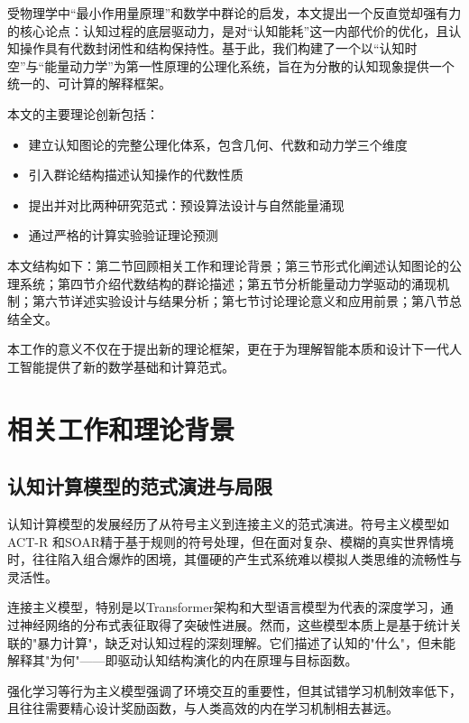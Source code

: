 \documentclass[12pt,a4paper]{article}
\begin{document}
受物理学中“最小作用量原理”和数学中群论的启发，本文提出一个反直觉却强有力的核心论点：认知过程的底层驱动力，是对“认知能耗”这一内部代价的优化，且认知操作具有代数封闭性和结构保持性。基于此，我们构建了一个以“认知时空”与“能量动力学”为第一性原理的公理化系统，旨在为分散的认知现象提供一个统一的、可计算的解释框架。

本文的主要理论创新包括：
\begin{itemize}
    \item 建立认知图论的完整公理化体系，包含几何、代数和动力学三个维度
    \item 引入群论结构描述认知操作的代数性质
    \item 提出并对比两种研究范式：预设算法设计与自然能量涌现
    \item 通过严格的计算实验验证理论预测
\end{itemize}

本文结构如下：第二节回顾相关工作和理论背景；第三节形式化阐述认知图论的公理系统；第四节介绍代数结构的群论描述；第五节分析能量动力学驱动的涌现机制；第六节详述实验设计与结果分析；第七节讨论理论意义和应用前景；第八节总结全文。

本工作的意义不仅在于提出新的理论框架，更在于为理解智能本质和设计下一代人工智能提供了新的数学基础和计算范式。

\section{相关工作和理论背景}

\subsection{认知计算模型的范式演进与局限}

认知计算模型的发展经历了从符号主义到连接主义的范式演进。符号主义模型如ACT-R \cite{anderson2004act} 和SOAR精于基于规则的符号处理，但在面对复杂、模糊的真实世界情境时，往往陷入组合爆炸的困境，其僵硬的产生式系统难以模拟人类思维的流畅性与灵活性。

连接主义模型，特别是以Transformer架构\cite{vaswani2017attention}和大型语言模型为代表的深度学习\cite{lecun2015deep}，通过神经网络的分布式表征取得了突破性进展。然而，这些模型本质上是基于统计关联的"暴力计算"，缺乏对认知过程的深刻理解。它们描述了认知的"什么"，但未能解释其"为何"——即驱动认知结构演化的内在原理与目标函数。

强化学习\cite{sutton2018reinforcement}等行为主义模型强调了环境交互的重要性，但其试错学习机制效率低下，且往往需要精心设计奖励函数，与人类高效的内在学习机制相去甚远。
\end{document}
